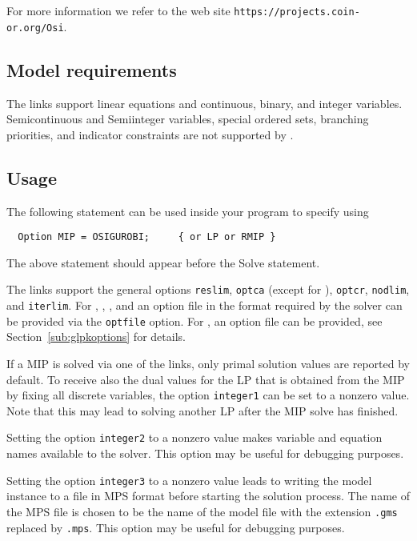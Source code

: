 For more information we refer to the \OSI web site \texttt{https://projects.coin-or.org/Osi}.

\subsection{Model requirements}

The \OSI links support linear equations and continuous, binary, and integer variables.
Semicontinuous and Semiinteger variables, special ordered sets, branching priorities, and indicator constraints are not supported by \OSI.

\subsection{Usage}

The following statement can be used inside your \GAMS program to specify using \OSIGUROBI
\begin{verbatim}
  Option MIP = OSIGUROBI;     { or LP or RMIP }
\end{verbatim}

The above statement should appear before the Solve statement.

The links support the general \GAMS options \texttt{reslim}, \texttt{optca} (except for \OSIGLPK), \texttt{optcr}, \texttt{nodlim}, and \texttt{iterlim}.
For \OSICPLEX, \OSIGUROBI, \OSIMOSEK, and \OSIXPRESS an option file in the format required by the solver can be provided via the \GAMS \texttt{optfile} option.
For \OSIGLPK, an \GAMS option file can be provided, see Section~\ref{sub:glpkoptions} for details.

If a MIP is solved via one of the \OSI links, only primal solution values are reported by default.
To receive also the dual values for the LP that is obtained from the MIP by fixing all discrete variables, the \GAMS option \texttt{integer1} can be set to a nonzero value. Note that this may lead to solving another LP after the MIP solve has finished.

Setting the \GAMS option \texttt{integer2} to a nonzero value makes variable and equation names available to the solver.
This option may be useful for debugging purposes.

Setting the \GAMS option \texttt{integer3} to a nonzero value leads to writing the model instance to a file in MPS format before starting the solution process.
The name of the MPS file is chosen to be the name of the \GAMS model file with the extension \texttt{.gms} replaced by \texttt{.mps}.
This option may be useful for debugging purposes.

